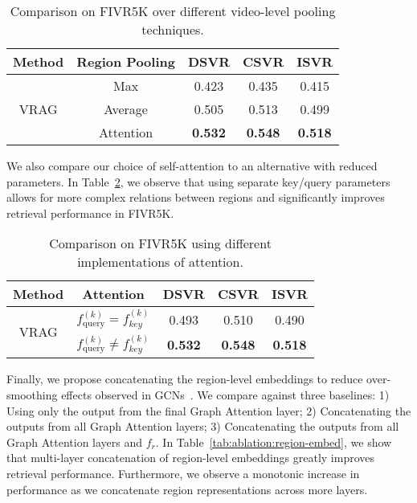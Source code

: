 \documentclass[letterpaper]{article} \usepackage{aaai22}  \usepackage{times}  \usepackage{helvet}  \usepackage{courier}  \usepackage[hyphens]{url}  \usepackage{graphicx} \urlstyle{rm} \usepackage{amsmath}
\begin{document}
\begin{table}[ht]
    \centering
    \begin{tabular}{|c|c|c|c|c|}
    \hline
         Method & Region Pooling & DSVR & CSVR & ISVR \\
         \hline\hline
         \multirow{3}{*}{VRAG} & Max & 0.423 & 0.435 & 0.415 \\
        \cline{2-5}
          & Average & 0.505 & 0.513 & 0.499 \\
         \cline{2-5}
          &  Attention & \textbf{0.532} & \textbf{0.548} & \textbf{0.518} \\
         \hline
    \end{tabular}
    \caption{\label{tab:ablation:region-pooling} {Comparison on FIVR5K over different video-level pooling techniques.}}
\end{table}
We also compare our choice of self-attention to an alternative with reduced parameters. In Table~\ref{tab:ablation:attention}, we observe that using separate key/query parameters allows for more complex relations between regions and significantly improves retrieval performance in FIVR5K.
\begin{table}[ht]
    \centering
    \begin{tabular}{|c|c|c|c|c|}
    \hline
         Method & Attention & DSVR & CSVR & ISVR \\
         \hline\hline
         \multirow{2}{*}{VRAG} & $f_\text{query}^{(k)} = f_{key}^{(k)}$ & 0.493 & 0.510 & 0.490 \\
         \cline{2-5}
          &  $f_\text{query}^{(k)} \neq f_{key}^{(k)}$ & \textbf{0.532} & \textbf{0.548} & \textbf{0.518} \\
         \hline
    \end{tabular}
    \caption{Comparison on FIVR5K using different implementations of attention.}
    \label{tab:ablation:attention}
\end{table}

Finally, we propose concatenating the region-level embeddings to reduce over-smoothing effects observed in GCNs~\cite{gcn:over-smoothing1, chen2019measuring}. We compare against three baselines: 1) Using only the output from the final Graph Attention layer; 2) Concatenating the outputs from all Graph Attention layers; 3) Concatenating the outputs from all Graph Attention layers and $f_r$. In Table~\ref{tab:ablation:region-embed}, we show that  multi-layer concatenation of region-level embeddings greatly improves retrieval performance. Furthermore, we observe a monotonic increase in performance as we concatenate  region representations across more layers.
\end{document}
